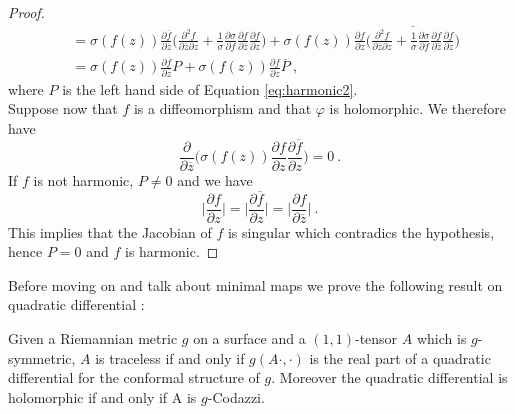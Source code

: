 \begin{proof}
\[\begin{split}
        & = \sigma(f(z)) \frac{\partial \overline{f}}{\partial \overline{z}} \Big( \frac{\partial^2 f}{\partial \overline{z} \partial z} + \frac{1}{\sigma} \frac{\partial \sigma}{\partial f} \frac{\partial f}{\partial \overline{z}} \frac{\partial f}{ \partial z}  \Big) + 
        \sigma(f(z)) \frac{\partial f}{ \partial z} \overline{ \Big(  \frac{\partial^2 f}{\partial \overline{z} \partial z} + \frac{1}{\sigma} \frac{\partial \sigma}{\partial f} \frac{\partial f}{\partial \overline{z}} \frac{\partial f}{ \partial z}  \Big) }  \\
        & = \sigma(f(z)) \frac{\partial \overline{f}}{\partial \overline{z}} P + \sigma(f(z)) \frac{\partial f}{ \partial z} \overline{P} \ ,
    \end{split}
    \]
    where $P$ is the left hand side of Equation \ref{eq:harmonic2}.\\
    Suppose now that $f$ is a diffeomorphism and that $\varphi$ is holomorphic. We therefore have
    \[
    \frac{ \partial}{\partial \overline{z}}\Big(\sigma(f(z)) \frac{\partial f}{ \partial z}  \frac{\partial \overline{f}}{\partial z} \Big) = 0 \ .
    \]
    If $f$ is not harmonic, $P\neq 0$ and we have
    \[
       \Big| \frac{\partial f}{ \partial z} \Big| = \Big| \frac{\partial \overline{f}}{ \partial z} \Big| = \Big| \frac{\partial f}{ \partial \overline{z}} \Big| \ .
    \]
    This implies that the Jacobian of $f$ is singular which contradics the hypothesis, hence $P=0$ and $f$ is harmonic.
\end{proof}
Before moving on and talk about minimal maps we prove the following result on quadratic differential :
\begin{lemma} \label{lem:HQD}
    Given a Riemannian metric $g$ on a surface and a $(1,1)$-tensor $A$ which is $g$-symmetric, $A$ is traceless if and only if $g(A \cdot, \cdot)$ is the real part of a quadratic differential for the conformal structure of $g$. Moreover the quadratic differential is holomorphic if and only if A is $g$-Codazzi.
\end{lemma}
